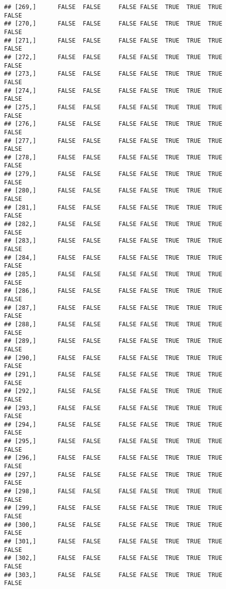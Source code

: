 \documentclass[
]{article}
\begin{document}
\begin{verbatim}
## [269,]      FALSE  FALSE     FALSE FALSE  TRUE  TRUE  TRUE         FALSE
## [270,]      FALSE  FALSE     FALSE FALSE  TRUE  TRUE  TRUE         FALSE
## [271,]      FALSE  FALSE     FALSE FALSE  TRUE  TRUE  TRUE         FALSE
## [272,]      FALSE  FALSE     FALSE FALSE  TRUE  TRUE  TRUE         FALSE
## [273,]      FALSE  FALSE     FALSE FALSE  TRUE  TRUE  TRUE         FALSE
## [274,]      FALSE  FALSE     FALSE FALSE  TRUE  TRUE  TRUE         FALSE
## [275,]      FALSE  FALSE     FALSE FALSE  TRUE  TRUE  TRUE         FALSE
## [276,]      FALSE  FALSE     FALSE FALSE  TRUE  TRUE  TRUE         FALSE
## [277,]      FALSE  FALSE     FALSE FALSE  TRUE  TRUE  TRUE         FALSE
## [278,]      FALSE  FALSE     FALSE FALSE  TRUE  TRUE  TRUE         FALSE
## [279,]      FALSE  FALSE     FALSE FALSE  TRUE  TRUE  TRUE         FALSE
## [280,]      FALSE  FALSE     FALSE FALSE  TRUE  TRUE  TRUE         FALSE
## [281,]      FALSE  FALSE     FALSE FALSE  TRUE  TRUE  TRUE         FALSE
## [282,]      FALSE  FALSE     FALSE FALSE  TRUE  TRUE  TRUE         FALSE
## [283,]      FALSE  FALSE     FALSE FALSE  TRUE  TRUE  TRUE         FALSE
## [284,]      FALSE  FALSE     FALSE FALSE  TRUE  TRUE  TRUE         FALSE
## [285,]      FALSE  FALSE     FALSE FALSE  TRUE  TRUE  TRUE         FALSE
## [286,]      FALSE  FALSE     FALSE FALSE  TRUE  TRUE  TRUE         FALSE
## [287,]      FALSE  FALSE     FALSE FALSE  TRUE  TRUE  TRUE         FALSE
## [288,]      FALSE  FALSE     FALSE FALSE  TRUE  TRUE  TRUE         FALSE
## [289,]      FALSE  FALSE     FALSE FALSE  TRUE  TRUE  TRUE         FALSE
## [290,]      FALSE  FALSE     FALSE FALSE  TRUE  TRUE  TRUE         FALSE
## [291,]      FALSE  FALSE     FALSE FALSE  TRUE  TRUE  TRUE         FALSE
## [292,]      FALSE  FALSE     FALSE FALSE  TRUE  TRUE  TRUE         FALSE
## [293,]      FALSE  FALSE     FALSE FALSE  TRUE  TRUE  TRUE         FALSE
## [294,]      FALSE  FALSE     FALSE FALSE  TRUE  TRUE  TRUE         FALSE
## [295,]      FALSE  FALSE     FALSE FALSE  TRUE  TRUE  TRUE         FALSE
## [296,]      FALSE  FALSE     FALSE FALSE  TRUE  TRUE  TRUE         FALSE
## [297,]      FALSE  FALSE     FALSE FALSE  TRUE  TRUE  TRUE         FALSE
## [298,]      FALSE  FALSE     FALSE FALSE  TRUE  TRUE  TRUE         FALSE
## [299,]      FALSE  FALSE     FALSE FALSE  TRUE  TRUE  TRUE         FALSE
## [300,]      FALSE  FALSE     FALSE FALSE  TRUE  TRUE  TRUE         FALSE
## [301,]      FALSE  FALSE     FALSE FALSE  TRUE  TRUE  TRUE         FALSE
## [302,]      FALSE  FALSE     FALSE FALSE  TRUE  TRUE  TRUE         FALSE
## [303,]      FALSE  FALSE     FALSE FALSE  TRUE  TRUE  TRUE         FALSE

\end{verbatim}
\end{document}
